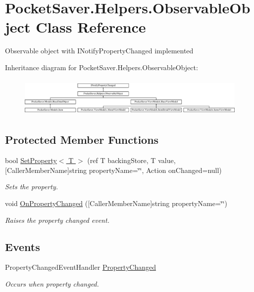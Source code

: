 \hypertarget{class_pocket_saver_1_1_helpers_1_1_observable_object}{}\section{Pocket\+Saver.\+Helpers.\+Observable\+Object Class Reference}
\label{class_pocket_saver_1_1_helpers_1_1_observable_object}


Observable object with I\+Notify\+Property\+Changed implemented  


Inheritance diagram for Pocket\+Saver.\+Helpers.\+Observable\+Object\+:\begin{figure}[H]
\begin{center}
\leavevmode
\includegraphics[height=1.958042cm]{class_pocket_saver_1_1_helpers_1_1_observable_object}
\end{center}
\end{figure}
\subsection*{Protected Member Functions}
\begin{DoxyCompactItemize}
\item 
bool \hyperlink{class_pocket_saver_1_1_helpers_1_1_observable_object_a0145f769ef5ed27c8031a768a0f9f53f}{Set\+Property$<$ T $>$} (ref T backing\+Store, T value, \mbox{[}Caller\+Member\+Name\mbox{]}string property\+Name=\char`\"{}\char`\"{}, Action on\+Changed=null)
\begin{DoxyCompactList}\small\item\em Sets the property. \end{DoxyCompactList}\item 
void \hyperlink{class_pocket_saver_1_1_helpers_1_1_observable_object_a3abc90b0599e021e2fd979a0cbff889c}{On\+Property\+Changed} (\mbox{[}Caller\+Member\+Name\mbox{]}string property\+Name=\char`\"{}\char`\"{})
\begin{DoxyCompactList}\small\item\em Raises the property changed event. \end{DoxyCompactList}\end{DoxyCompactItemize}
\subsection*{Events}
\begin{DoxyCompactItemize}
\item 
Property\+Changed\+Event\+Handler \hyperlink{class_pocket_saver_1_1_helpers_1_1_observable_object_a5bec60ddca9a88a38affe84844c2f16d}{Property\+Changed}
\begin{DoxyCompactList}\small\item\em Occurs when property changed. \end{DoxyCompactList}\end{DoxyCompactItemize}


